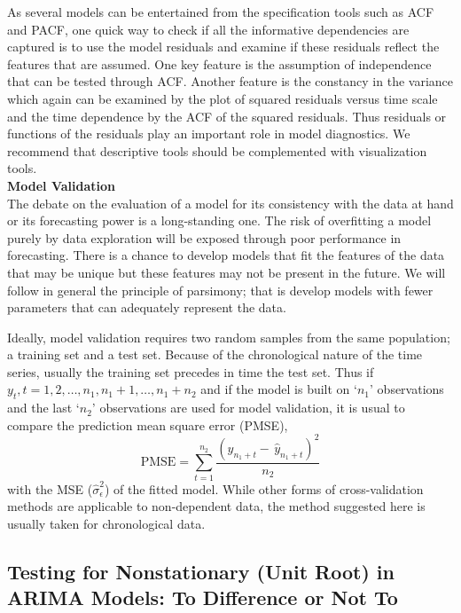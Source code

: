 As several models can be entertained from the specification tools such as ACF and PACF, one quick way to check if all the informative dependencies are captured is to use the model residuals and examine if these residuals reflect the features that are assumed. One key feature is the assumption of independence that can be tested through ACF. Another feature is the constancy in the variance which again can be examined by the plot of squared residuals versus time scale and the time dependence by the ACF of the squared residuals. Thus residuals or functions of the residuals play an important role in model diagnostics. We recommend that descriptive tools should be complemented with visualization tools. \\


\noindent \textbf{Model Validation} \\


The debate on the evaluation of a model for its consistency with the data at hand or its forecasting power is a long-standing one. The risk of overfitting a model purely by data exploration will be exposed through poor performance in forecasting. There is a chance to develop models that fit the features of the data that may be unique but these features may not be present in the future. We will follow in general the principle of parsimony; that is develop models with fewer parameters that can adequately represent the data. 


Ideally, model validation requires two random samples from the same population; a training set and a test set. Because of the chronological nature of the time series, usually the training set precedes in time the test set. Thus if $y_t, t=1,2,\ldots,n_1,n_1+1,\ldots,n_1+n_2$ and if the model is built on `$n_1$' observations and the last `$n_2$' observations are used for model validation, it is usual to compare the prediction mean square error (PMSE),
	\begin{equation}\label{eqn:pmse}
	\text{PMSE} = \sum_{t=1}^{n_2} \frac{(y_{n_1+t} - \,\hat{y}_{n_1+t})^2}{n_2}
	\end{equation}
with the MSE ($\hat{\sigma}_\epsilon^2$) of the fitted model. While other forms of cross-validation methods are applicable to non-dependent data, the method suggested here is usually taken for chronological data.



\subsection{Testing for Nonstationary (Unit Root) in ARIMA Models: To Difference or Not To} 


